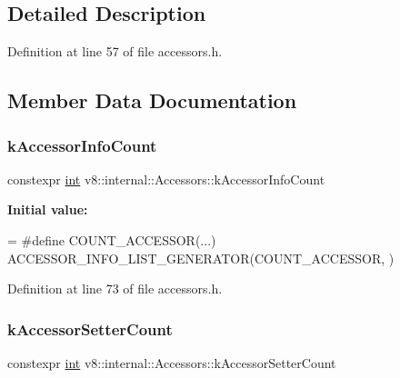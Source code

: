 \subsection{Detailed Description}


Definition at line 57 of file accessors.\+h.



\subsection{Member Data Documentation}
\mbox{\label{classv8_1_1internal_1_1Accessors_a0218e22685a2ed701dd1f43ea6206411}} 
\subsubsection{\texorpdfstring{k\+Accessor\+Info\+Count}{kAccessorInfoCount}}
{\footnotesize\ttfamily constexpr \mbox{\hyperlink{classint}{int}} v8\+::internal\+::\+Accessors\+::k\+Accessor\+Info\+Count\hspace{0.3cm}{\ttfamily [static]}}

{\bfseries Initial value\+:}
\begin{DoxyCode}
=
\textcolor{preprocessor}{#define COUNT\_ACCESSOR(...) }
\textcolor{preprocessor}{      ACCESSOR\_INFO\_LIST\_GENERATOR(COUNT\_ACCESSOR, )}
\end{DoxyCode}


Definition at line 73 of file accessors.\+h.

\mbox{\label{classv8_1_1internal_1_1Accessors_a5537800ae53340c0ec441c0efd250c64}} 
\subsubsection{\texorpdfstring{k\+Accessor\+Setter\+Count}{kAccessorSetterCount}}
{\footnotesize\ttfamily constexpr \mbox{\hyperlink{classint}{int}} v8\+::internal\+::\+Accessors\+::k\+Accessor\+Setter\+Count\hspace{0.3cm}{\ttfamily [static]}}

